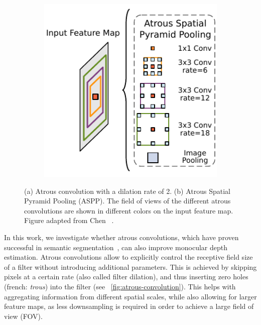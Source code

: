 \begin{figure}
\begin{subfigure}[b]{0.6\linewidth}
        \includegraphics[width=1.0\linewidth]{images/architecture/aspp.pdf}
        \caption{}
        \label{fig:aspp}
    \end{subfigure}
    \caption{(a) Atrous convolution with a dilation rate of 2. (b) Atrous Spatial Pyramid Pooling (ASPP). The field of views of the different atrous convolutions are shown in different colors on the input feature map. Figure adapted from Chen \etal~\cite{chen2018deeplab}.}
\end{figure}

In this work, we investigate whether atrous convolutions, which have proven successful in semantic segmentation~\cite{chen2018deeplab, chen2018encoder}, can also improve monocular depth estimation.
Atrous convolutions allow to explicitly control the receptive field size of a filter without introducing additional parameters.
This is achieved by skipping pixels at a certain rate (also called filter dilation), and thus inserting zero holes (french: \textit{trous}) into the filter (see \figurename~\ref{fig:atrous-convolution}).
This helps with aggregating information from different spatial scales, while also allowing for larger feature maps, as less downsampling is required in order to achieve a large field of view (FOV). 

